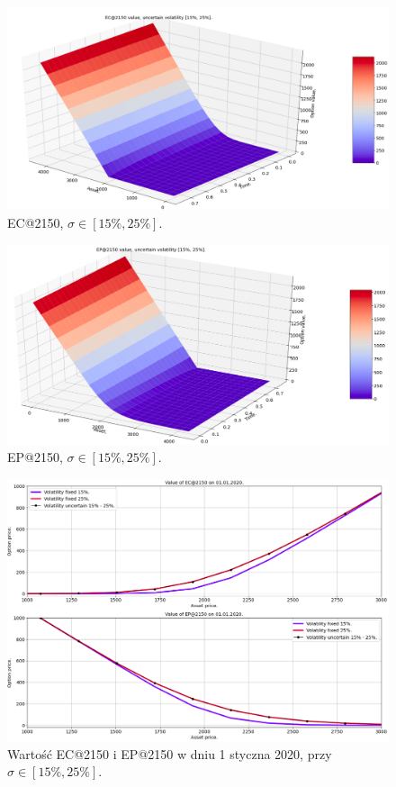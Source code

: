 \documentclass[12pt]{article}
\begin{document}
\begin{figure}[H]
    \centering
    \includegraphics[width=\textwidth,height=\textheight,keepaspectratio]{EC_2150_uncert_vol.png}
    \caption{EC@2150, $\sigma \in [15\%, 25\%].$}
    \label{fig:ec_2150_uncer_vol}
\end{figure}

\begin{figure}[H]
    \centering
    \includegraphics[width=\textwidth,height=\textheight,keepaspectratio]{ep_2150_uncert_vol.png}
    \caption{EP@2150, $\sigma \in [15\%, 25\%].$}
    \label{fig:ep_2150_uncer_vol}
\end{figure}

\begin{figure}[H]
    \centering
    \includegraphics[width=\textwidth,height=\textheight,keepaspectratio]{value_ec_ep_uncert_vol_t_0.png}
    \caption{Wartość EC@2150 i EP@2150 w dniu 1 styczna 2020, przy $\sigma \in [15\%, 25\%].$}
    \label{fig:value_ec_ep_uncert_vol_t_0}
\end{figure}
\end{document}
